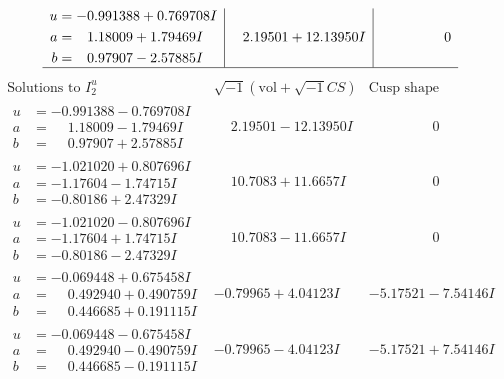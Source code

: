 \documentclass[1p]{elsarticle_modified}
\theoremstyle{definition}
\newcommand{\I}{\sqrt{-1}}
\begin{document}
$$\begin{array}{c|c|c}
\begin{aligned}
u &= -0.991388 + 0.769708 I \\
a &= \phantom{-}1.18009 + 1.79469 I \\
b &= \phantom{-}0.97907 - 2.57885 I\end{aligned}
 & \phantom{-}2.19501 + 12.13950 I & \phantom{-0.000000 } 0\\
 \hline 
 \end{array}$$\newpage$$\begin{array}{c|c|c}  
\text{Solutions to }I^u_{2}& \I (\text{vol} + \sqrt{-1}CS) & \text{Cusp shape}\\
 \hline 
\begin{aligned}
u &= -0.991388 - 0.769708 I \\
a &= \phantom{-}1.18009 - 1.79469 I \\
b &= \phantom{-}0.97907 + 2.57885 I\end{aligned}
 & \phantom{-}2.19501 - 12.13950 I & \phantom{-0.000000 } 0 \\ \hline\begin{aligned}
u &= -1.021020 + 0.807696 I \\
a &= -1.17604 - 1.74715 I \\
b &= -0.80186 + 2.47329 I\end{aligned}
 & \phantom{-}10.7083 + 11.6657 I & \phantom{-0.000000 } 0 \\ \hline\begin{aligned}
u &= -1.021020 - 0.807696 I \\
a &= -1.17604 + 1.74715 I \\
b &= -0.80186 - 2.47329 I\end{aligned}
 & \phantom{-}10.7083 - 11.6657 I & \phantom{-0.000000 } 0 \\ \hline\begin{aligned}
u &= -0.069448 + 0.675458 I \\
a &= \phantom{-}0.492940 + 0.490759 I \\
b &= \phantom{-}0.446685 + 0.191115 I\end{aligned}
 & -0.79965 + 4.04123 I & -5.17521 - 7.54146 I \\ \hline\begin{aligned}
u &= -0.069448 - 0.675458 I \\
a &= \phantom{-}0.492940 - 0.490759 I \\
b &= \phantom{-}0.446685 - 0.191115 I\end{aligned}
 & -0.79965 - 4.04123 I & -5.17521 + 7.54146 I \\ \hline\begin{aligned}

\end{aligned}
\end{array}$$
\end{document}
